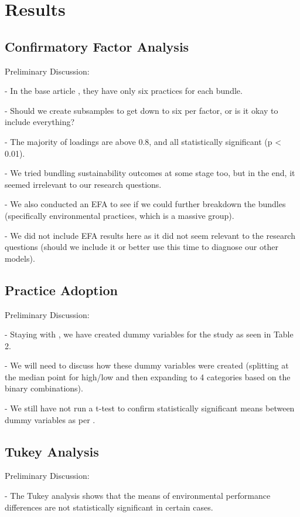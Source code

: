 \section{Results}
\subsection*{Confirmatory Factor Analysis}
Preliminary Discussion:

- In the base article \cite{furlanComplementarityLeanManufacturing2011}, they have only six practices for each bundle.

- Should we create subsamples to get down to six per factor, or is it okay to include everything?

- The majority of loadings are above 0.8, and all statistically significant (p < 0.01).

- We tried bundling sustainability outcomes at some stage too, but in the end, it seemed irrelevant to our research questions.

- We also conducted an EFA to see if we could further breakdown the bundles (specifically environmental practices, which is a massive group).

- We did not include EFA results here as it did not seem relevant to the research questions (should we include it or better use this time to diagnose our other models).

% 
\subsection*{Practice Adoption}
Preliminary Discussion:

- Staying with \cite{furlanComplementarityLeanManufacturing2011}, we have created dummy variables for the study as seen in Table 2.

- We will need to discuss how these dummy variables were created (splitting at the median point for high/low and then expanding to 4 categories based on the binary combinations).

- We still have not run a t-test to confirm statistically significant means between dummy variables as per \cite{furlanComplementarityLeanManufacturing2011}.

\subsection*{Tukey Analysis}
Preliminary Discussion:

- The Tukey analysis shows that the means of environmental performance differences are not statistically significant in certain cases.

